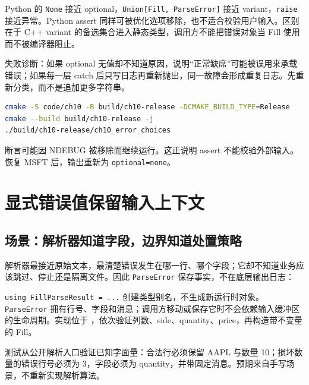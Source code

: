 \begin{pythonbridge}
Python 的 \texttt{None} 接近 optional，\texttt{Union[Fill, ParseError]} 接近 variant，\texttt{raise} 接近异常。Python assert 同样可被优化选项移除，也不适合校验用户输入。区别在于 C++ variant 的备选集合进入静态类型，调用方不能把错误对象当 Fill 使用而不被编译器阻止。

\end{pythonbridge}

失败诊断：如果 optional 无值却不知道原因，说明“正常缺席”可能被误用来承载错误；如果每一层 catch 后只写日志再重新抛出，同一故障会形成重复日志。先重新分类，而不是追加更多字符串。

\begin{lstlisting}[language=bash]
cmake -S code/ch10 -B build/ch10-release -DCMAKE_BUILD_TYPE=Release
cmake --build build/ch10-release -j
./build/ch10-release/ch10_error_choices
\end{lstlisting}

断言可能因 NDEBUG 被移除而继续运行。这正说明 assert 不能校验外部输入。恢复 MSFT 后，输出重新为 \texttt{optional=none}。

\section{显式错误值保留输入上下文}

\subsection{场景：解析器知道字段，边界知道处置策略}

解析器最接近原始文本，最清楚错误发生在哪一行、哪个字段；它却不知道业务应该跳过、停止还是隔离文件。因此 \texttt{ParseError} 保存事实，不在底层输出日志：



\texttt{using FillParseResult = ...} 创建类型别名，不生成新运行时对象。\texttt{ParseError} 拥有行号、字段和消息；调用方移动或保存它时不会依赖输入缓冲区的生命周期。实现位于 ，依次验证列数、side、quantity、price，再构造带不变量的 Fill。

测试从公开解析入口验证已知字面量：合法行必须保留 AAPL 与数量 10；损坏数量的错误行号必须为 3，字段必须为 quantity，并带固定消息。预期来自手写场景，不重新实现解析算法。

